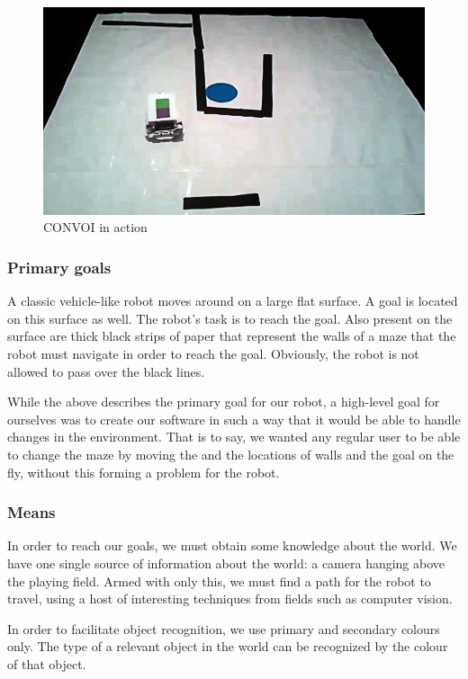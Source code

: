 \documentclass[10pt, abstracton, twocolumn]{scrartcl}
\begin{document}
\begin{figure}[h]
        \centering
        \includegraphics[width=\columnwidth]{pictures/photo1convoi.png}
        \caption{\small CONVOI in action}
        \label{fig:photo1convoi}
\end{figure}

\subsubsection{Primary goals}
A classic vehicle-like robot moves around on a large flat surface. A goal is located on this surface as well. The robot's task is to reach the goal. Also present on the surface are thick black strips of paper that represent the walls of a maze that the robot must navigate in order to reach the goal. Obviously, the robot is not allowed to pass over the black lines.

While the above describes the primary goal for our robot, a high-level goal for ourselves was to create our software in such a way that it would be able to handle changes in the environment. That is to say, we wanted any regular user to be able to change the maze by moving the and the locations of walls and the goal on the fly, without this forming a problem for the robot.

\subsubsection{Means}
In order to reach our goals, we must obtain some knowledge about the world. We have one single source of information about the world: a camera hanging above the playing field. Armed with only this, we must find a path for the robot to travel, using a host of interesting techniques from fields such as computer vision.

In order to facilitate object recognition, we use primary and secondary colours only. The type of a relevant object in the world can be recognized by the colour of that object.
\end{document}
